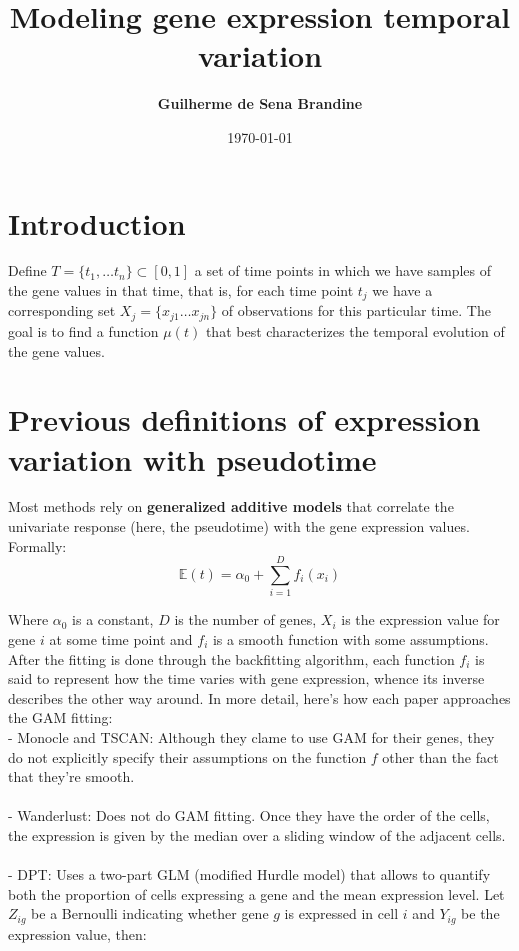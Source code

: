 \documentclass[11pt]{article}
\title{\bf Modeling gene expression temporal variation}
\author{\bf Guilherme de Sena Brandine}
\date{\today}
\begin{document}
\maketitle

\section{Introduction}
Define $T = \{ t_1, \dots t_n\} \subset [0,1]$ a set of time points in which we have samples of the gene values in that time, that is, for each time point $t_j$ we have a corresponding set $X_j = \{x_{j1} \dots x_{jn} \}$ of observations for this particular time. The goal is to find a function $\mu(t)$ that best characterizes the temporal evolution of the gene values. 

\section{Previous definitions of expression variation with pseudotime}
Most methods rely on \textbf{generalized additive models} that correlate the univariate response (here, the pseudotime) with the gene expression values. Formally:
$$
\mathbb{E}(t) = \alpha_0 + \sum_{i=1}^{D} f_i (x_i)
$$

Where $\alpha_0$ is a constant, $D$ is the number of genes, $X_i$ is the expression value for gene $i$ at some time point and $f_i$ is a smooth function with some assumptions. After the fitting is done through the backfitting algorithm, each function $f_i$ is said to represent how the time varies with gene expression, whence its inverse describes the other way around. In more detail, here's how each paper approaches the GAM fitting:
\\
 - Monocle and TSCAN: Although they clame to use GAM for their genes, they do not explicitly specify their assumptions on the function $f$ other than the fact that they're smooth.\\
 \\
 - Wanderlust: Does not do GAM fitting. Once they have the order of the cells, the expression is given by the median over a sliding window of the adjacent cells. \\
\\
 - DPT: Uses a two-part GLM (modified Hurdle model) that allows to quantify both the proportion of cells expressing a gene and the mean expression level. Let $Z_{ig}$ be a Bernoulli indicating whether gene $g$ is expressed in cell $i$ and $Y_{ig}$ be the expression value, then:
 
\end{document}
